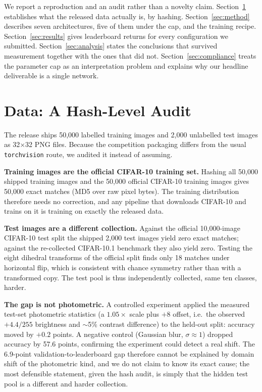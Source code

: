 \documentclass[letterpaper]{article} %
\begin{document}
We report a reproduction and an audit rather than a novelty claim. Section~\ref{sec:data}
establishes what the released data actually is, by hashing. Section~\ref{sec:method} describes
seven architectures, five of them under the cap, and the training recipe. Section~\ref{sec:results} gives
leaderboard returns for every configuration we submitted. Section~\ref{sec:analysis} states
the conclusions that survived measurement together with the ones that did not.
Section~\ref{sec:compliance} treats the parameter cap as an interpretation problem and explains
why our headline deliverable is a single network.

\section{Data: A Hash-Level Audit}
\label{sec:data}

The release ships 50{,}000 labelled training images and 2{,}000 unlabelled test images as
32$\times$32 PNG files. Because the competition packaging differs from the usual
\texttt{torchvision} route, we audited it instead of assuming.

\textbf{Training images are the official CIFAR-10 training set.} Hashing all 50{,}000 shipped
training images and the 50{,}000 official CIFAR-10 training images gives 50{,}000 exact
matches (MD5 over raw pixel bytes). The training distribution therefore needs no correction,
and any pipeline that downloads CIFAR-10 and trains on it is training on exactly the released
data.

\textbf{Test images are a different collection.} Against the official 10{,}000-image CIFAR-10
test split the shipped 2{,}000 test images yield zero exact matches; against the re-collected
CIFAR-10.1 benchmark \citep{recht2018cifar} they also yield zero. Testing the eight dihedral
transforms of the official split finds only 18 matches under horizontal flip, which is
consistent with chance symmetry rather than with a transformed copy. The test pool is thus
independently collected, same ten classes, harder.

\textbf{The gap is not photometric.} A controlled experiment applied the measured test-set
photometric statistics (a $1.05\times$ scale plus $+8$ offset, i.e.\ the observed $+4.4/255$
brightness and $\sim$5\% contrast difference) to the held-out split: accuracy moved by
$+0.2$ points. A negative control (Gaussian blur, $\sigma\approx1$) dropped accuracy by 57.6
points, confirming the experiment could detect a real shift. The 6.9-point
validation-to-leaderboard gap therefore cannot be explained by domain shift of the
photometric kind, and we do not claim to know its exact cause; the most defensible statement,
given the hash audit, is simply that the hidden test pool is a different and harder collection.
\end{document}
